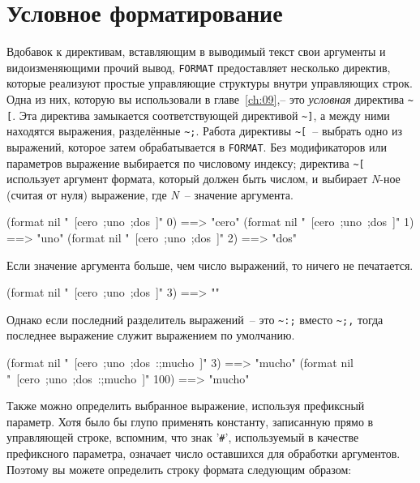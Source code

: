 \vfill{}

\section{Условное форматирование}

Вдобавок к директивам, вставляющим в выводимый текст свои аргументы и видоизменяющими
прочий вывод, \lstinline{FORMAT} предоставляет несколько директив, которые реализуют простые
управляющие структуры внутри управляющих строк. Одна из них, которую вы использовали в
главе~\ref{ch:09},-- это \textit{условная} директива \lstinline!~[!. Эта директива
замыкается соответствующей директивой \lstinline!~]!, а между ними находятся выражения,
разделённые \lstinline!~;!. Работа директивы \lstinline!~[!~-- выбрать одно из выражений,
которое затем обрабатывается в \lstinline{FORMAT}. Без модификаторов или параметров выражение
выбирается по числовому индексу; директива \lstinline!~[! использует аргумент формата,
который должен быть числом, и выбирает \textit{N}-ное (считая от нуля) выражение, где
\textit{N}~-- значение аргумента.

\begin{myverb}
(format nil "~[cero~;uno~;dos~]" 0) ==> "cero"
(format nil "~[cero~;uno~;dos~]" 1) ==> "uno"
(format nil "~[cero~;uno~;dos~]" 2) ==> "dos"
\end{myverb}

Если значение аргумента больше, чем число выражений, то ничего не печатается.

\begin{myverb}
(format nil "~[cero~;uno~;dos~]" 3) ==> ""
\end{myverb}

Однако если последний разделитель выражений~-- это \lstinline!~:;! вместо \lstinline!~;,!
тогда последнее выражение служит выражением по умолчанию.

\begin{myverb}
(format nil "~[cero~;uno~;dos~:;mucho~]" 3)   ==> "mucho"
(format nil "~[cero~;uno~;dos~:;mucho~]" 100) ==> "mucho"
\end{myverb}

Также можно определить выбранное выражение, используя префиксный параметр. Хотя было бы
глупо применять константу, записанную прямо в управляющей строке, вспомним, что знак
'\lstinline!#!', используемый в качестве префиксного параметра, означает число оставшихся
для обработки аргументов. Поэтому вы можете определить строку формата следующим образом:

